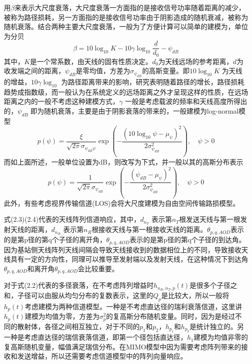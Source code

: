 \documentclass[bachelor,nocolorlinks, printoneside]{seuthesis} %
\begin{document}
\begin{Main}
用$\beta$来表示大尺度衰落，大尺度衰落一方面指的是接收信号功率随着距离的减少，被称为路径损耗，另一方面指的是接收信号功率由于阴影造成的随机衰减，被称为随机衰落。结合两种主要大尺度衰落，一般为了方便计算可以简单的建模为，单位为分贝
\begin{equation}\label{key}
\beta=10 \log_{10} K-10 \gamma \log_{10} \frac{d}{d_{0}}-\psi_{dB}
\end{equation}
其中，$K$是一个常系数，由天线的固有性质决定。$d_{0}$为天线远场的参考距离，$d$为收发端之间的距离，$\psi_{dB}$是零均值，方差为$\sigma_{\psi_{dB}}$的高斯变量。即$10 \log_{10} K $ 为天线的增益，$ 10 \gamma \log_{10}$ 为路径距离带来的影响，研究表明随着路径的增长，路径损耗趋势成指数级，而一般认为在系统定义的远场距离之外才呈现这样的性质，在远场距离之内的一般不考虑这种建模方式，$\gamma$ 一般是考虑载波的频率和天线高度所得出的，$ \psi_{dB}$ 即为随机衰落，主要是由于阴影衰落的带来的，一般建模为log-normal模型
\begin{equation}\label{key}
p(\psi)=\frac{\xi}{\sqrt{2\pi}\sigma_{\psi_{dB}\psi}}\exp\left({-\frac{(10\log_10 \psi - \mu_\psi)^{2}}{2\sigma_{\psi_{dB}}^{2}}}\right),\quad \psi > 0
\end{equation}
而如上面所述，一般单位设置为dB，则改写为下式，并一般以其的高斯分布表示
\begin{equation}\label{key}
p(\psi)=\frac{1}{\sqrt{2\pi}\sigma_{\psi_{dB}}}\exp\left({-\frac{(\psi_{dB} - \mu_\psi)^{2}}{2\sigma_{\psi_{dB}}^{2}}}\right),\quad \psi > 0
\end{equation}
此外，有些考虑视界传输信道(LOS)会将大尺度建模为自由空间传输路损模型。

式(2.3)(2.4)代表的天线阵列信道响应，其中，$d_{n_{T}}$ 表示第$n_{T}$根发送天线与第一根发射天线的距离，$d_{n_{R}}$ 表示第$n_{R}$根接收天线与第一根接收天线的距离。$\theta_{p,q,AOD}$表示的是第p径的第q个子径的离开角，$\theta_{p,q,AOD}$表示的是第p径的第q个子径的到达角。因为基站侧天线阵列天线间隔会导致天线接收到的数据相位上的不同，导致接收天线具有一定的方向性，同理可以推导至发射端以及发射天线，在这种情况下到达角$\theta_{p,q,AOD}$和离开角$\theta_{p,q,AOD}$会比较重要。

对于式(2.2)代表的多径衰落，在不考虑阵列增益时$h_{n_{R},n_{T},p}(t)$是很多个子径之和，子径可以由服从均匀分布的复数表示，这里的$Q_{p}$是比较大，所以一般将$h_{p}(t)$考虑建模为两种信道模型。一种是不考虑直达径的瑞利衰落信道，这里讲$h_{p}(t)$建模为均值为零，方差为$\sigma_{p}^{2}$的复高斯分布随机变量。同时，因为是经过不同的散射体，各径之间相互独立，对于不同的$p_{1}$和$p_{2}$，$h_{p_{1}}$和$h_{p_{2}}$是统计独立的。另一种是考虑直达径的瑞信衰落信道，即第一个径包括直达径，$h_{1}$建模为均值非零的复高斯随机变量，幅值满足瑞信分布。在MIMO模型中因为需要考虑阵列带来的接收和发送增益，所以还需要考虑信道模型中的阵列向量响应。


\end{Main}
\end{document}
